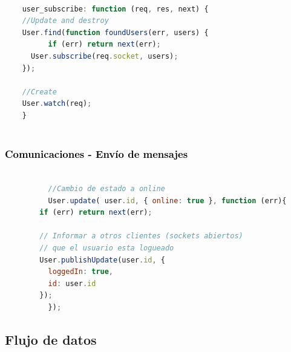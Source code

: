 \documentclass[xcolor=x11names,compress]{beamer}
\theoremstyle{cuadrado}
\begin{document}
{\begin{frame}[fragile]
\begin{adjustwidth}{-2em}{-1em}

  \begin{lstlisting}[language=JavaScript]

    user_subscribe: function (req, res, next) {
	//Update and destroy
	User.find(function foundUsers(err, users) {
          if (err) return next(err);
	  User.subscribe(req.socket, users);
	});

	//Create
	User.watch(req);
    }
    
  \end{lstlisting}
\end{adjustwidth}

\end{frame}



\begin{frame}[fragile]
\frametitle{\textcolor{black}{ Comunicaciones - Envío de mensajes }}


\begin{adjustwidth}{-8em}{-1em}
      \begin{lstlisting}[language=JavaScript]

	      //Cambio de estado a online
	      User.update( user.id, { online: true }, function (err){
		if (err) return next(err);

		// Informar a otros clientes (sockets abiertos) 
		// que el usuario esta logueado
		User.publishUpdate(user.id, {
		  loggedIn: true,
		  id: user.id
		});
	      });

      \end{lstlisting}
\end{adjustwidth}

\end{frame}



\subsection{Flujo de datos}

}
\end{document}
